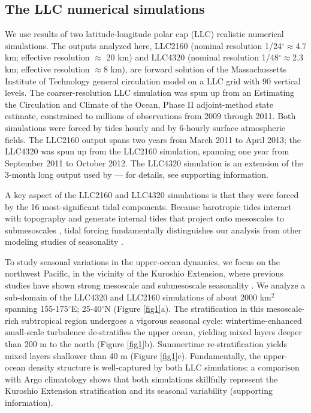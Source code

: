 \documentclass[grl]{agutex2015}
\begin{document}
\begin{article}
\section{The LLC numerical simulations}
We use results of two latitude-longitude polar cap (LLC)
realistic numerical simulations. The outputs
analyzed here, LLC2160 (nominal resolution 1/24$^\circ$$\approx$4.7 km;
effective resolution $\approx$ 20 km) and LLC4320
(nominal resolution 1/48$^\circ$$\approx$2.3 km;
effective resolution $\approx$8 km),   are
forward solution of the Massachussetts Institute of Technology general circulation model \citep[MITgcm; ][]{marshall_etal1997}
on a LLC grid  \citep{forget_etal2015} with
90 vertical levels. The coarser-resolution LLC simulation was
spun up from an Estimating the Circulation and Climate of the Ocean, Phase II \citep[ECCO2; ][]{menemenlis_etal2008}
adjoint-method state estimate, constrained to millions
of observations from 2009 through 2011. Both simulations were forced by
tides hourly and by 6-hourly surface atmospheric fields. The LLC2160
output spans two years from March 2011 to April 2013; the LLC4320 was spun up from
the LLC2160 simulation, spanning one year from September 2011 to October 2012.
The LLC4320 simulation is an extension of the 3-month long output used by
\citet{rocha_etal2016} --- for details, see supporting information.

A key aspect of the LLC2160 and LLC4320 simulations is that they were forced by
the 16 most-significant tidal components.
Because barotropic tides interact with topography and generate internal
tides that project onto mesoscales to submesoscales
\citep[e.g., ][]{rocha_etal2016}, tidal forcing fundamentally distinguishes our analysis
from other modeling studies of seasonality \citep{sasaki_etal2014,qiu_etal2014}.

To study seasonal variations in the upper-ocean dynamics, we focus on the northwest
Pacific, in the vicinity of the Kuroshio
Extension, where previous studies have shown strong mesoscale and submesoscale seasonality
\citep{sasaki_etal2014,qiu_etal2014}.
We analyze a sub-domain of the LLC4320 and LLC2160 simulations of about 2000 km$^2$
spanning 155-175$^\circ$E; 25-40$^\circ$N (Figure \ref{fig1}a). The stratification
in this mesoscale-rich subtropical region undergoes a vigorous seasonal cycle: wintertime-enhanced
small-scale turbulence de-stratifies the upper ocean, yielding mixed layers
deeper than 200 m to the north (Figure \ref{fig1}b). Summertime re-stratification yields mixed layers shallower
than 40 m (Figure \ref{fig1}c).
Fundamentally, the upper-ocean density structure is well-captured by both LLC simulations:
a comparison with Argo climatology shows that both simulations skillfully represent the Kuroshio
Extension stratification and its seasonal variability  (supporting information).


\end{article}
\end{document}

